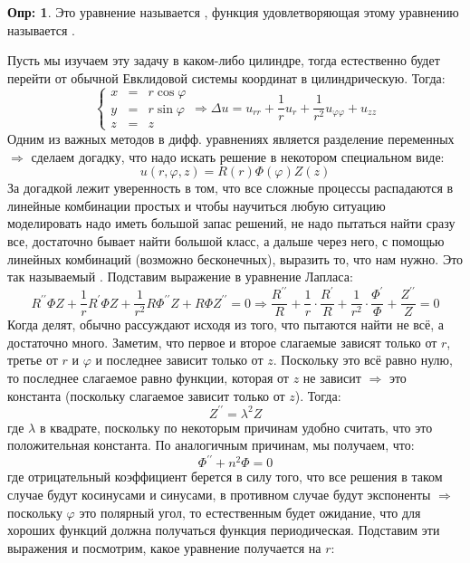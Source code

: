 \documentclass[12pt]{article}
\theoremstyle{definition}
\newtheorem{defn}{Опр:}
\begin{document}
\begin{defn}
	Это уравнение называется , функция удовлетворяющая этому уравнению называется .
\end{defn}
Пусть мы изучаем эту задачу в каком-либо цилиндре, тогда естественно будет перейти от обычной Евклидовой системы координат в цилиндрическую. Тогда:
$$
	\left\{
	\begin{array}{lcl}
		x &=& r \cos{\varphi} \\
		y &=& r \sin{\varphi}\\
		z &=& z
	\end{array}
	\right. \Rightarrow \Delta u = u_{rr} + \dfrac{1}{r}u_r + \dfrac{1}{r^2}u_{\varphi\varphi} + u_{zz}
$$
Одним из важных методов в дифф. уравнениях является разделение переменных $\Rightarrow$ сделаем догадку, что надо искать решение в некотором специальном виде:
$$
	u(r,\varphi, z) = R(r)\Phi(\varphi)Z(z)
$$
За догадкой лежит уверенность в том, что все сложные процессы распадаются в линейные комбинации простых и чтобы научиться любую ситуацию моделировать надо иметь большой запас решений, не надо пытаться найти сразу все, достаточно бывает найти большой класс, а дальше через него, с помощью линейных комбинаций (возможно бесконечных), выразить то, что нам нужно. Это так называемый . Подставим выражение в уравнение Лапласа:
$$
	R^{\prime\prime}\Phi Z + \dfrac{1}{r} R^\prime \Phi Z + \dfrac{1}{r^2}R \Phi^{\prime\prime} Z + R \Phi Z^{\prime\prime} = 0 \Rightarrow \dfrac{R^{\prime\prime}}{R} +  \dfrac{1}{r}{\cdot} \dfrac{R^\prime}{R} + \dfrac{1}{r^2}{\cdot}\dfrac{\Phi^{\prime}}{\Phi} + \dfrac{Z^{\prime\prime}}{Z} = 0
$$
Когда делят, обычно рассуждают исходя из того, что пытаются найти не всё, а достаточно много. Заметим, что первое и второе слагаемые зависят только от $r$, третье от $r$ и $\varphi$ и последнее зависит только от $z$. Поскольку это всё равно нулю, то последнее слагаемое равно функции, которая от $z$ не зависит $\Rightarrow$ это константа (поскольку слагаемое зависит только от $z$). Тогда: 
$$
	Z^{\prime \prime} = \lambda^2 Z
$$
где $\lambda$ в квадрате, поскольку по некоторым причинам удобно считать, что это положительная константа. По аналогичным причинам, мы получаем, что:
$$
	\Phi^{\prime\prime} + n^2 \Phi = 0
$$
где отрицательный коэффициент берется в силу того, что все решения в таком случае будут косинусами и синусами, в противном случае будут экспоненты $\Rightarrow$ поскольку $\varphi$ это полярный угол, то естественным будет ожидание, что для хороших функций должна получаться функция периодическая. Подставим эти выражения и посмотрим, какое уравнение получается на $r$:
\end{document}
